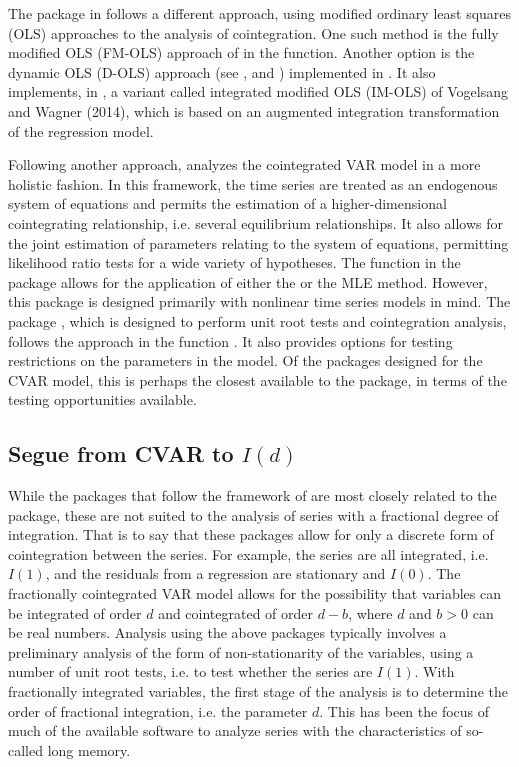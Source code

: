 \documentclass[article]{jss}
\newcommand{\fct}[1]{\code{#1()}}
\begin{document}
The  package in \cite{cointReg2016} follows a different approach, using modified ordinary least squares (OLS) approaches to the analysis of cointegration. 
One such method is the fully modified OLS (FM-OLS) approach of \citet{PhillipsHansen1990} in the \fct{cointRegFM} function. 
Another option is the dynamic OLS (D-OLS) approach (see \citet{PhillipsLoretan1991}, \citet{Saikkonen1991} and \citet{StockWatson1993}) implemented in \fct{cointRegD}. 
It also implements, in \fct{cointRegIM}, a variant called integrated modified OLS (IM-OLS) of Vogelsang and Wagner (2014), 
which is based on an augmented integration transformation of the regression model. 

Following another approach, 
\citet{Johansen1995} analyzes the cointegrated VAR model in a more holistic fashion.
In this framework, the time series are treated as an endogenous system of equations and permits the estimation of a higher-dimensional cointegrating relationship, i.e. several equilibrium relationships. 
% 
It also allows for the joint estimation of parameters relating to the system of equations, permitting likelihood ratio tests for a wide variety of hypotheses. 
The \fct{VECM} function in the  package allows for the application of either the \citet{EngleGranger1987} or the \citet{Johansen1995} MLE method. 
However, this package is designed primarily with nonlinear time series models in mind. 
The  package \citep{urca2016}, 
which is designed to perform unit root tests and cointegration analysis, 
follows the \citet{Johansen1995} approach in the function \fct{ca.jo}. 
It also provides options for testing restrictions on the parameters in the model. 
Of the packages designed for the CVAR model, this is perhaps the closest available to the  package, in terms of the testing opportunities available.

\subsection{Segue from CVAR to $I(d)$}

While the packages that follow the framework of \citet{Johansen1995} are most closely related to the  package, these are not suited to the analysis of series with a fractional degree of integration. 
That is to say that these packages allow for only a discrete form of cointegration between the series. 
For example, the series are all integrated, i.e. $I(1)$, and the residuals from a regression are stationary and $I(0)$. 
The fractionally cointegrated VAR model allows for the possibility that variables can be integrated of order $d$ and cointegrated of order $d - b$, where $d$ and $b>0$ can be real numbers. 
% 
Analysis using the above packages typically involves a preliminary analysis of the form of non-stationarity of the variables, using a number of unit root tests, i.e. to test whether the series are $I(1)$. 
With fractionally integrated variables, the first stage of the analysis is to determine the order of fractional integration, i.e. the parameter $d$. 
This has been the focus of much of the available software to analyze series with the characteristics of so-called long memory. 
\end{document}
